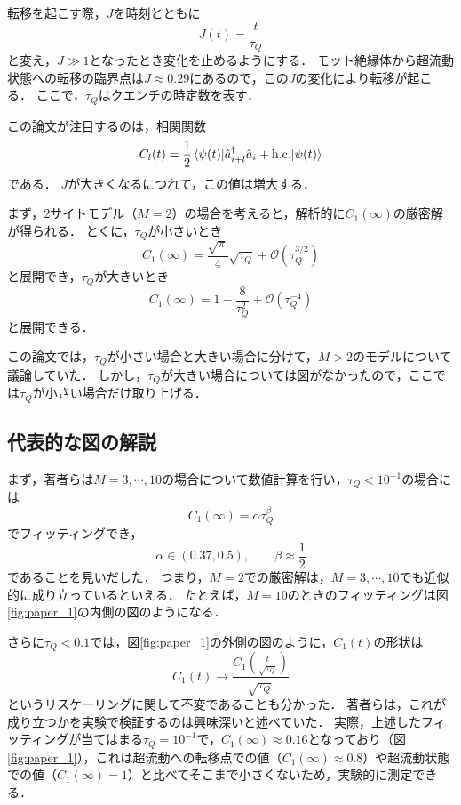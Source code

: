 \documentclass[a4paper,11pt]{jsarticle}
\begin{document}
転移を起こす際，$J$を時刻とともに
\begin{equation}
  J(t) = \frac{t}{\tau_Q}
\end{equation}
と変え，$J\gg 1$となったとき変化を止めるようにする．
モット絶縁体から超流動状態への転移の臨界点は$J\approx 0.29$にあるので，この$J$の変化により転移が起こる．
ここで，$\tau_Q$はクエンチの時定数を表す．

この論文が注目するのは，相関関数
\begin{equation}
  C_l(t) = \frac{1}{2} \ev{\hat{a}^{\dagger}_{i+l} \hat{a}_i + \mathrm{h.c.}}{\psi (t)}
\end{equation}
である．
$J$が大きくなるにつれて，この値は増大する．

まず，2サイトモデル（$M=2$）の場合を考えると，解析的に$C_1(\infty)$の厳密解が得られる．
とくに，$\tau_Q$が小さいとき
\begin{equation}
  C_1 (\infty) = \frac{\sqrt{\pi}}{4}\sqrt{\tau_Q} + \mathcal{O}\left(\tau_Q^{3/2}\right)
\end{equation}
と展開でき，$\tau_Q$が大きいとき
\begin{equation}
  C_1 (\infty) = 1 - \frac{8}{\tau_Q^2} + \mathcal{O}\left(\tau_Q^{-4}\right)
\end{equation}
と展開できる．

この論文では，$\tau_Q$が小さい場合と大きい場合に分けて，$M>2$のモデルについて議論していた．
しかし，$\tau_Q$が大きい場合については図がなかったので，ここでは$\tau_Q$が小さい場合だけ取り上げる．

\subsection*{代表的な図の解説}

まず，著者らは$M=3,\cdots,10$の場合について数値計算を行い，$\tau_Q < 10^{-1}$の場合には
\begin{equation}
  C_1(\infty) = \alpha \tau_Q^{\beta}
\end{equation}
でフィッティングでき，
\begin{equation}
  \alpha \in (0.37,0.5),\qquad \beta \approx \frac{1}{2}
\end{equation}
であることを見いだした．
つまり，$M=2$での厳密解は，$M=3,\cdots,10$でも近似的に成り立っているといえる．
たとえば，$M=10$のときのフィッティングは図\ref{fig:paper_1}の内側の図のようになる．

さらに$\tau_Q < 0.1$では，図\ref{fig:paper_1}の外側の図のように，$C_1(t)$の形状は
\begin{equation}
  C_1(t) \to \frac{C_1\left(\frac{t}{\sqrt{\tau_Q}}\right)}{\sqrt{\tau_Q}}
\end{equation}
というリスケーリングに関して不変であることも分かった．
著者らは，これが成り立つかを実験で検証するのは興味深いと述べていた．
実際，上述したフィッティングが当てはまる$\tau_Q = 10^{-1}$で，$C_1(\infty)\approx 0.16$となっており（図\ref{fig:paper_1}），これは超流動への転移点での値（$C_1(\infty)\approx 0.8$）や超流動状態での値（$C_1(\infty) = 1$）と比べてそこまで小さくないため，実験的に測定できる．
\end{document}

